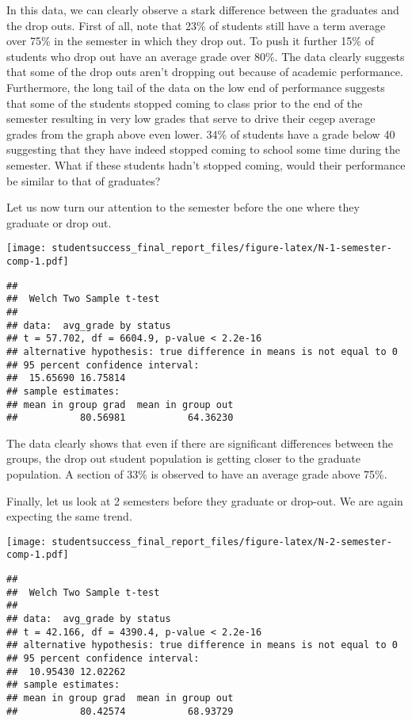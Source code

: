 \documentclass[]{book}
\theoremstyle{definition}
\theoremstyle{definition}
\theoremstyle{remark}
\begin{document}
In this data, we can clearly observe a stark difference between the
graduates and the drop outs. First of all, note that 23\% of students
still have a term average over 75\% in the semester in which they drop
out. To push it further 15\% of students who drop out have an average
grade over 80\%. The data clearly suggests that some of the drop outs
aren't dropping out because of academic performance. Furthermore, the
long tail of the data on the low end of performance suggests that some
of the students stopped coming to class prior to the end of the semester
resulting in very low grades that serve to drive their cegep average
grades from the graph above even lower. 34\% of students have a grade
below 40 suggesting that they have indeed stopped coming to school some
time during the semester. What if these students hadn't stopped coming,
would their performance be similar to that of graduates?

Let us now turn our attention to the semester before the one where they
graduate or drop out.

\texttt{[image: studentsuccess\_final\_report\_files/figure-latex/N-1-semester-comp-1.pdf]}

\begin{verbatim}
## 
##  Welch Two Sample t-test
## 
## data:  avg_grade by status
## t = 57.702, df = 6604.9, p-value < 2.2e-16
## alternative hypothesis: true difference in means is not equal to 0
## 95 percent confidence interval:
##  15.65690 16.75814
## sample estimates:
## mean in group grad  mean in group out 
##           80.56981           64.36230
\end{verbatim}

The data clearly shows that even if there are significant differences
between the groups, the drop out student population is getting closer to
the graduate population. A section of 33\% is observed to have an
average grade above 75\%.

Finally, let us look at 2 semesters before they graduate or drop-out. We
are again expecting the same trend.

\texttt{[image: studentsuccess\_final\_report\_files/figure-latex/N-2-semester-comp-1.pdf]}

\begin{verbatim}
## 
##  Welch Two Sample t-test
## 
## data:  avg_grade by status
## t = 42.166, df = 4390.4, p-value < 2.2e-16
## alternative hypothesis: true difference in means is not equal to 0
## 95 percent confidence interval:
##  10.95430 12.02262
## sample estimates:
## mean in group grad  mean in group out 
##           80.42574           68.93729
\end{verbatim}
\end{document}
